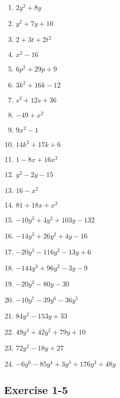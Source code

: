 \begin{multicols}{2}
\begin{enumerate}[label=\textbf{\arabic*}., itemsep=5pt]
\item $2y^2 + 8y$%
\item $y^2 + 7y + 10$%
\item $2 + 3t +2t^2$%
\item $x^2 - 16$%
\item $6p^2 + 29p + 9$%
\item $3k^2 +16k - 12$%
\item $s^2 + 12s +36$%
\item $-49 + x^2$%
\item $9x^2 - 1$%
\item $14k^2 + 17k + 6$%
\item $1 -8x + 16x^2$%
\item $y^2 - 2y - 15$%
\item $16 - x^2$%
\item $81 + 18x + x^2$%
\item $-10y^3 + 4y^2 + 103y - 132$%
\item $-14y^3 + 26y^2 + 4y -16$ %
\item $-20y^3 -116y^2 -13y +6$%
\item $-144y^3 + 96y^2 -3y -9$%
\item $-20y^2 - 80y - 30$%
\item $-10y^7 - 39y^6 - 36y^5$%
\item $84y^2 - 153y +33$%
\item $49y^3 + 42y^2 + 79y + 10$%
\item $72y^2 - 18y + 27$%
\item $-6y^6 - 85y^4 + 3y^3 + 176y^2 + 48y$%
\end{enumerate}
\end{multicols}
\subsection{Exercise 1-5} %

